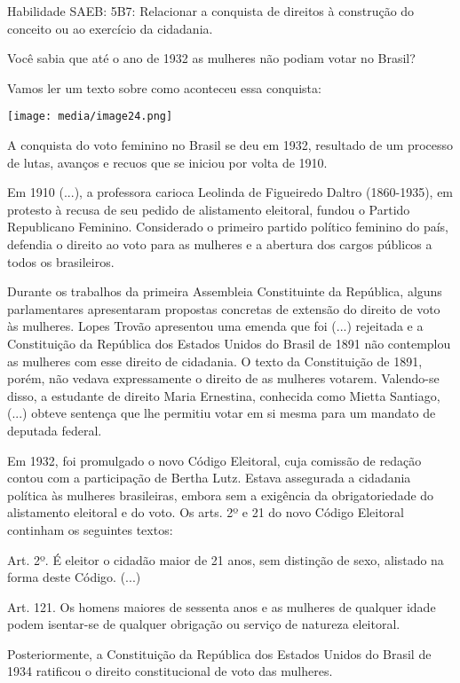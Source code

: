 Habilidade SAEB: 5B7: Relacionar a conquista de direitos à construção do
conceito ou ao exercício da cidadania.

Você sabia que até o ano de 1932 as mulheres não podiam votar no Brasil?

Vamos ler um texto sobre como aconteceu essa conquista:

\texttt{[image: media/image24.png]}

A conquista do voto feminino no Brasil se deu em 1932, resultado de um
processo de lutas, avanços e recuos que se iniciou por volta de 1910.

Em 1910 (...), a professora carioca Leolinda de Figueiredo Daltro
(1860-1935), em protesto à recusa de seu pedido de alistamento
eleitoral, fundou o Partido Republicano Feminino. Considerado o primeiro
partido político feminino do país, defendia o direito ao voto para as
mulheres e a abertura dos cargos públicos a todos os brasileiros.

Durante os trabalhos da primeira Assembleia Constituinte da República,
alguns parlamentares apresentaram propostas concretas de extensão do
direito de voto às mulheres. Lopes Trovão apresentou uma emenda que foi
(...) rejeitada e a Constituição da República dos Estados Unidos do
Brasil de 1891 não contemplou as mulheres com esse direito de cidadania.
O texto da Constituição de 1891, porém, não vedava expressamente o
direito de as mulheres votarem. Valendo-se disso, a estudante de direito
Maria Ernestina, conhecida como Mietta Santiago, (...) obteve sentença
que lhe permitiu votar em si mesma para um mandato de deputada federal.

Em 1932, foi promulgado o novo Código Eleitoral, cuja comissão de
redação contou com a participação de Bertha Lutz. Estava assegurada a
cidadania política às mulheres brasileiras, embora sem a exigência da
obrigatoriedade do alistamento eleitoral e do voto. Os arts. 2º e 21 do
novo Código Eleitoral continham os seguintes textos:

Art. 2º. É eleitor o cidadão maior de 21 anos, sem distinção de sexo,
alistado na forma deste Código. (...)

Art. 121. Os homens maiores de sessenta anos e as mulheres de qualquer
idade podem isentar-se de qualquer obrigação ou serviço de natureza
eleitoral.

Posteriormente, a Constituição da República dos Estados Unidos do Brasil
de 1934 ratificou o direito constitucional de voto das mulheres.

